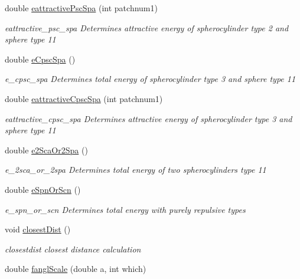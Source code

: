 \begin{DoxyCompactItemize}
double \hyperlink{class_pair_energy_calculator_abb9b02e3b85aead2f108407e1499e4e1}{eattractive\+Psc\+Spa} (int patchnum1)
\begin{DoxyCompactList}\small\item\em eattractive\+\_\+psc\+\_\+spa Determines attractive energy of spherocylinder type 2 and sphere type 11 \end{DoxyCompactList}\item 
double \hyperlink{class_pair_energy_calculator_a1bcc82f931ef1b8a0ecc761a80bd9b16}{e\+Cpsc\+Spa} ()
\begin{DoxyCompactList}\small\item\em e\+\_\+cpsc\+\_\+spa Determines total energy of spherocylinder type 3 and sphere type 11 \end{DoxyCompactList}\item 
double \hyperlink{class_pair_energy_calculator_a1b5d1cb78e05609a8ddea41ff5689a9f}{eattractive\+Cpsc\+Spa} (int patchnum1)
\begin{DoxyCompactList}\small\item\em eattractive\+\_\+cpsc\+\_\+spa Determines attractive energy of spherocylinder type 3 and sphere type 11 \end{DoxyCompactList}\item 
double \hyperlink{class_pair_energy_calculator_a3e50d4d5ca1aaa5d21fe815eeb09a7ba}{e2\+Sca\+Or2\+Spa} ()
\begin{DoxyCompactList}\small\item\em e\+\_\+2sca\+\_\+or\+\_\+2spa Determines total energy of two spherocylinders type 11 \end{DoxyCompactList}\item 
double \hyperlink{class_pair_energy_calculator_aa48b1686ec135fe052d48f84578af483}{e\+Spn\+Or\+Scn} ()
\begin{DoxyCompactList}\small\item\em e\+\_\+spn\+\_\+or\+\_\+scn Determines total energy with purely repulsive types \end{DoxyCompactList}\item 
void \hyperlink{class_pair_energy_calculator_aeb01996df33c2833b4f549f615eab8eb}{closest\+Dist} ()
\begin{DoxyCompactList}\small\item\em closestdist closest distance calculation \end{DoxyCompactList}\item 
double \hyperlink{class_pair_energy_calculator_a5ce37994047ed91e042f10fab3c1f98d}{fangl\+Scale} (double a, int which)

\end{DoxyCompactItemize}
